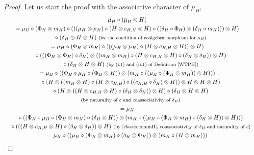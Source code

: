 \documentclass[10pt,a4paper]{amsart}
\numberwithin{equation}{section}
\begin{document}
\begin{proof}
Let us start the proof with the associative character of $\overline{\mu}_{H}$,
\begin{gather*}
 \overline{\mu}_{H}\circ (\overline{\mu}_{H}\otimes H )\\
= \mu_{H}\circ (\Phi_{H}\otimes m_{H} ) \circ (((\mu_{H}\otimes\mu_{H})\circ (H\otimes c_{H,H}\otimes H )\circ ((\delta_{H}\circ\Phi_{H})\otimes (\delta_{H}\circ m_{H})))\otimes H)\\
\quad{}\circ (\delta_{H}\otimes H\otimes H )\ \text{\footnotesize\textnormal{(by the condition of coalgebra morphism for $\mu_{H}$)}}\\
= \mu_{H}\circ (\Phi_{H}\otimes m_{H} )\circ ( ( (\mu_{H}\otimes \mu_{H} )\circ (H\otimes c_{H,H}\otimes H ) )\otimes H )\\
\quad{} \circ ( ( (\Phi_{H}\otimes \Phi_{H} )\circ\delta_{H} )\otimes ( (m_{H}\otimes m_{H} )\circ (H\otimes c_{H,H}\otimes H )\circ (\delta_{H}\otimes\delta_{H} ) )\otimes H )\\
\quad{} \circ (\delta_{H}\otimes H\otimes H )\ \text{\footnotesize\textnormal{(by (i.1) and (ii.1) of Definition \ref{WTPH})}}\\
= \mu_{H}\circ ( (\Phi_{H}\circ\mu_{H}\circ (\Phi_{H}\otimes H ) )\otimes (m_{H}\circ ( (\mu_{H}\circ (\Phi_{H}\otimes m_{H} ) )\otimes H ) ) )\\
\quad{} \circ (H\otimes ( (m_{H}\otimes H )\circ (H\otimes c_{H,H} )\circ ( (c_{H,H}\circ\delta_{H} )\otimes H ) )\otimes H\otimes H\otimes H )\\
\quad{} \circ (H\otimes ( (H\otimes c_{H,H}\otimes H )\circ (\delta_{H}\otimes\delta_{H} ) )\otimes H )\circ (\delta_{H}\otimes H\otimes H )\\
\quad{}\, \text{\footnotesize\textnormal{(by naturality of $c$ and coassociativity of $\delta_{H}$)}}\\
= \mu_{H}\\
\quad{}\circ( (\Phi_{H}\circ\mu_{H}\circ (\Phi_{H}\otimes m_{H} )\circ (\delta_{H}\otimes H ) )\otimes(m_{H}\circ( (\mu_{H}\circ (\Phi_{H}\otimes m_{H} )\circ (\delta_{H}\otimes H ) )\otimes H)))\\
\quad{}\circ ( ( (H\otimes c_{H,H}\otimes H )\circ (\delta_{H}\otimes\delta_{H} ) )\otimes H ) \ \text{\footnotesize\textnormal{(by~\eqref{classcocommH}, coassociativity of $\delta_{H}$ and naturality of $c$)}}\\
= \mu_{H}\circ ( (\mu_{H}\circ (\Phi_{H}\otimes m_{H} )\circ (\delta_{H}\otimes \Phi_{H} ) )\otimes (m_{H}\circ (H\otimes m_{H} ) ) )\\

\end{gather*}
\end{proof}
\end{document}
